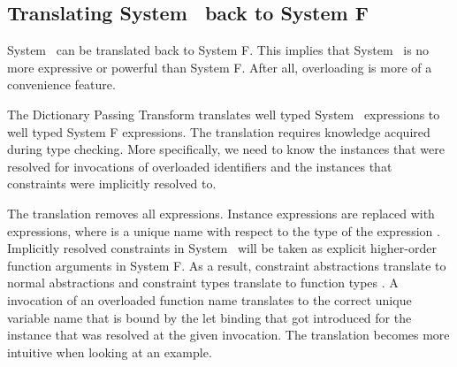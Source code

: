 \subsection{Translating System \Fo\ back to System F}
System \Fo\ can be translated back to System F. 
This implies that System \Fo\ is no more expressive or powerful than System F. 
After all, overloading is more of a convenience feature. 

\noindent The Dictionary Passing Transform translates well typed System \Fo\ expressions to well typed System F expressions. 
The translation requires knowledge acquired during type checking. 
More specifically, we need to know the instances that were resolved for invocations of overloaded identifiers and the instances that constraints were implicitly resolved to.

\noindent The translation removes all \inl{|\Decl|}expressions. 
Instance expressions  are replaced with  expressions, where  is a unique name with respect to the type  of the expression . 
Implicitly resolved constraints in System \Fo\ will be taken as explicit higher-order function arguments in System F.
As a result, constraint abstractions  translate to normal abstractions  and constraint types  translate to function types . 
A invocation of an overloaded function name  translates to the correct unique variable name  that is bound by the let binding that got introduced for the instance that was resolved at the given invocation. 
The translation becomes more intuitive when looking at an example.

